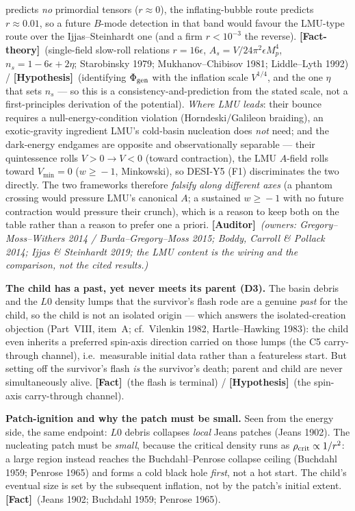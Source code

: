 \documentclass[11pt]{article}
\newcommand{\Fact}{\textbf{\textcolor{green!45!black}{[Fact]}}}
\newcommand{\Auditor}{\textbf{\textcolor{teal!55!black}{[Auditor]}}}
\newcommand{\factth}{\textcolor{green!40!black}{\textbf{[Fact-theory]}}}
\newcommand{\hyp}{\textcolor{orange!80!black}{\textbf{[Hypothesis]}}}
\begin{document}
predicts \emph{no} primordial tensors ($r\!\approx\!0$), the inflating-bubble route predicts $r\!\approx\!0.01$, so a future $B$-mode detection in that band would favour the LMU-type route over the Ijjas--Steinhardt one (and a firm $r\!<\!10^{-3}$ the reverse). \factth\ (single-field slow-roll relations $r=16\epsilon$, $A_s=V/24\pi^2\epsilon M_p^4$, $n_s=1-6\epsilon+2\eta$; Starobinsky 1979; Mukhanov--Chibisov 1981; Liddle--Lyth 1992) / \hyp\ (identifying $\Phi_{\rm gen}$ with the inflation scale $V^{1/4}$, and the one $\eta$ that sets $n_s$ --- so this is a consistency-and-prediction from the stated scale, not a first-principles derivation of the potential). \emph{Where LMU leads}: their bounce requires a null-energy-condition violation (Horndeski/Galileon braiding), an exotic-gravity ingredient LMU's cold-basin nucleation does \emph{not} need; and the dark-energy endgames are opposite and observationally separable --- their quintessence rolls $V\!>\!0\!\to\!V\!<\!0$ (toward contraction), the LMU $A$-field rolls toward $V_{\min}=0$ ($w\!\ge\!-1$, Minkowski), so DESI-Y5 (F1) discriminates the two directly. The two frameworks therefore \emph{falsify along different axes} (a phantom crossing would pressure LMU's canonical $A$; a sustained $w\!\ge\!-1$ with no future contraction would pressure their crunch), which is a reason to keep both on the table rather than a reason to prefer one a priori. \Auditor\ \emph{(owners: Gregory--Moss--Withers 2014 / Burda--Gregory--Moss 2015; Boddy, Carroll \& Pollack 2014; Ijjas \& Steinhardt 2019; the LMU content is the wiring and the comparison, not the cited results.)}

\medskip\noindent\textbf{The child has a past, yet never meets its parent (D3).} The basin debris and the $L0$ density lumps that the survivor's flash rode are a genuine \emph{past} for the child, so the child is not an isolated origin --- which answers the isolated-creation objection (Part~VIII, item~A; cf.\ Vilenkin 1982, Hartle--Hawking 1983): the child even inherits a preferred spin-axis direction carried on those lumps (the C5 carry-through channel), i.e.\ measurable initial data rather than a featureless start. But setting off the survivor's flash \emph{is} the survivor's death; parent and child are never simultaneously alive. \Fact\ (the flash is terminal) / \hyp\ (the spin-axis carry-through channel).

\medskip\noindent\textbf{Patch-ignition and why the patch must be small.} Seen from the energy side, the same endpoint: $L0$ debris collapses \emph{local} Jeans patches (Jeans 1902). The nucleating patch must be \emph{small}, because the critical density runs as $\rho_{\rm crit}\propto 1/r^2$: a large region instead reaches the Buchdahl--Penrose collapse ceiling (Buchdahl 1959; Penrose 1965) and forms a cold black hole \emph{first}, not a hot start. The child's eventual size is set by the subsequent inflation, not by the patch's initial extent. \Fact\ (Jeans 1902; Buchdahl 1959; Penrose 1965).
\end{document}
